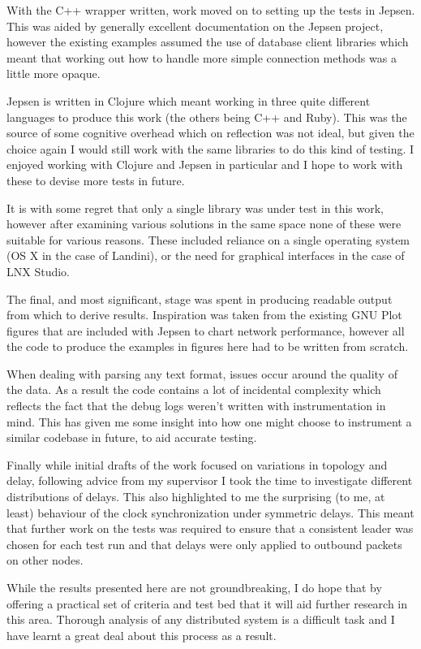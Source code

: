 \documentclass[11pt]{article} %
\theoremstyle{plain}
\theoremstyle{definition}
\begin{document}
With the C++ wrapper written, work moved on to setting up the tests in Jepsen.
This was aided by generally excellent documentation on the Jepsen project,
however the existing examples assumed the use of database client libraries
which meant that working out how to handle more simple connection methods was a
little more opaque.

Jepsen is written in Clojure which meant working in three quite different
languages to produce this work (the others being C++ and Ruby). This was the
source of some cognitive overhead which on reflection was not ideal, but given
the choice again I would still work with the same libraries to do this kind of
testing. I enjoyed working with Clojure and Jepsen in particular and I hope to
work with these to devise more tests in future.

It is with some regret that only a single library was under test in this work,
however after examining various solutions in the same space none of these were
suitable for various reasons. These included reliance on a single operating
system (OS X in the case of Landini\cite{narveson2013landini}), or the need for
graphical interfaces in the case of LNX Studio\cite{lnxstudio}.

The final, and most significant, stage was spent in producing readable output
from which to derive results. Inspiration was taken from the existing
GNU Plot figures that are included with Jepsen to chart network performance,
however all the code to produce the examples in figures here had to be written
from scratch.

When dealing with parsing any text format, issues occur around the quality of
the data. As a result the code contains a lot of incidental complexity which
reflects the fact that the debug logs weren't written with instrumentation in
mind. This has given me some insight into how one might choose to instrument a
similar codebase in future, to aid accurate testing.

Finally while initial drafts of the work focused on variations in topology and
delay, following advice from my supervisor I took the time to investigate
different distributions of delays. This also highlighted to me the surprising
(to me, at least) behaviour of the clock synchronization under symmetric
delays. This meant that further work on the tests was required to ensure that a
consistent leader was chosen for each test run and that delays were only
applied to outbound packets on other nodes.

While the results presented here are not groundbreaking, I do hope that by
offering a practical set of criteria and test bed that it will aid further
research in this area. Thorough analysis of any distributed system is a
difficult task and I have learnt a great deal about this process as a result.
\end{document}

